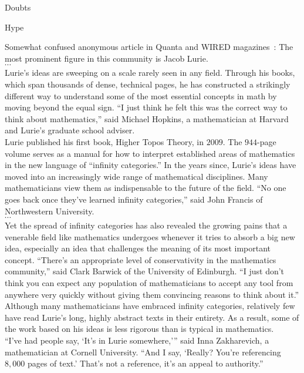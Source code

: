 \begin{plSection}{Doubts}
\begin{plSection}{Hype}
\begin{plQuote}
{Somewhat confused anonymous article in
Quanta and WIRED 
magazines~\cite{Hartnett:2019:Lurie,Quanta:2019:Lurie}:}
{}
The most prominent figure in this community is Jacob Lurie. 
\\
$\cdots$
\\
Lurie’s ideas are sweeping on a scale rarely seen in any field. 
Through his books, which span thousands of dense, technical pages, 
he has constructed a strikingly different way to understand some 
of the most essential concepts in math by moving 
beyond the equal sign. 
``I just think he felt this was the correct way to think 
about mathematics,'' said Michael Hopkins, a mathematician 
at Harvard and Lurie’s graduate school adviser.
\\
Lurie published his first book, Higher Topos Theory, in $2009$. 
The $944$-page volume serves as a manual for how 
to interpret established areas of mathematics 
in the new language of ``infinity categories.'' 
In the years since, Lurie’s ideas have moved 
into an increasingly wide range of mathematical disciplines. 
Many mathematicians view them as indispensable 
to the future of the field. ``No one goes back once they’ve learned 
infinity categories,'' said John Francis of Northwestern University.
\\
$\cdots$
\\
Yet the spread of infinity categories has also revealed 
the growing pains that a venerable field 
like mathematics undergoes whenever it tries 
to absorb a big new idea, especially an idea 
that challenges the meaning of its most important concept. 
``There’s an appropriate level of conservativity 
in the mathematics community,'' 
said Clark Barwick of the University of Edinburgh. 
``I just don’t think you can expect 
any population of mathematicians to accept any tool 
from anywhere very quickly without giving them convincing reasons 
to think about it.''
\\
Although many mathematicians have embraced infinity categories, 
relatively few have read Lurie’s long, highly abstract texts 
in their entirety. As a result, some of the work 
based on his ideas is less rigorous than is typical in mathematics.
\\
``I’ve had people say, ‘It’s in Lurie somewhere,’'' 
said Inna Zakharevich, a mathematician at Cornell University. 
``And I say, ‘Really? You’re referencing $8,000$ pages of text.’ 
That’s not a reference, it’s an appeal to authority.''
\end{plQuote}


\end{plSection}
\end{plSection}
